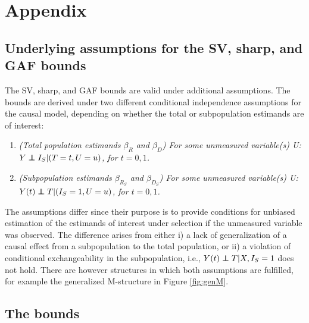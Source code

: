 \section*{Appendix}\label{appendix}

\subsection*{Underlying assumptions for the SV, sharp, and GAF bounds}\label{underlying-assumptions-for-the-sv-sharp-and-gaf-bounds}

The SV, sharp, and GAF bounds are valid under additional assumptions. The bounds
are derived under two different conditional independence assumptions for the
causal model, depending on whether the total or subpopulation estimands are of
interest:

\begin{enumerate}
\def\labelenumi{\arabic{enumi}.}
\item
  \emph{(Total population estimands \(\beta_R\) and \(\beta_D\))
  For some unmeasured variable(s) \textit{U}: \(Y \perp\hskip -7pt \perp I_S|(T=t,U=u)\),
  for \(t=0,1\).}
\item
  \emph{(Subpopulation estimands \(\beta_{R_S}\) and \(\beta_{D_S}\))
  For some unmeasured variable(s) \textit{U}: \(Y(t) \perp\hskip -7pt \perp T|(I_S=1,U=u)\),
  for \(t=0,1\).}
\end{enumerate}

The assumptions differ since their purpose is to provide conditions for unbiased
estimation of the estimands of interest under selection if the unmeasured
variable was observed. The difference arises from either i) a lack of
generalization of a causal effect from a subpopulation to the total population,
or ii) a violation of conditional exchangeability in the subpopulation, i.e.,
\(Y(t)\perp\hskip -7pt \perp T|X,I_S=1\) does not hold. There are however structures
in which both assumptions are fulfilled, for example the generalized M-structure
in Figure \ref{fig:genM}.

\subsection*{The bounds}\label{the-bounds}

